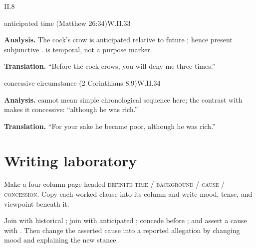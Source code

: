 \begin{courseunit}{II.8}
\begin{workedexample}{anticipated time (Matthew 26:34)}{W.II.33}

\textbf{Analysis.}  The cock's crow is anticipated relative to future ; hence
present subjunctive .   is temporal, not a purpose marker.

\textbf{Translation.}  ``Before the cock crows, you will deny me three times.''
\end{workedexample}

\begin{workedexample}{concessive circumstance (2 Corinthians 8:9)}{W.II.34}

\textbf{Analysis.}   cannot mean simple chronological sequence here; the
contrast with  makes it concessive: ``although he was rich.''

\textbf{Translation.}  ``For your sake he became poor, although he was rich.''
\end{workedexample}

\section{Writing laboratory}

Make a four-column page headed \textsc{definite time / background / cause / concession}.
Copy each worked clause into its column and write mood, tense, and viewpoint beneath it.

Join  with historical ; join
 with anticipated ; concede
 before ; and assert a cause with .
Then change the asserted cause into a reported allegation by changing mood and explaining the
new stance.



\end{courseunit}

